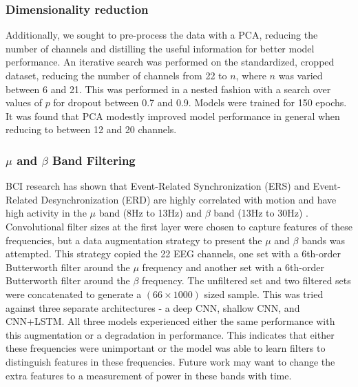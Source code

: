 \documentclass[10pt,twocolumn,letterpaper]{article}
\begin{document}
\subsubsection{Dimensionality reduction}
Additionally, we sought to pre-process the data with a PCA, reducing the number
of channels and distilling the useful information for better model performance.
An iterative search was performed on the standardized, cropped dataset,
reducing the number of channels from 22 to $n$, where $n$ was varied between 6
and 21. 
This was performed in a nested fashion with a search over values of $p$ for
dropout between 0.7 and 0.9. Models were trained for 150 epochs. It was found
that PCA modestly improved model performance in general when reducing to
between 12 and 20 channels.


\subsubsection{$\mu$ and $\beta$ Band Filtering}


BCI research has shown that Event-Related Synchronization (ERS) and
Event-Related Desynchronization (ERD) are highly correlated with motion and have
high activity in the $\mu$ band (8Hz to 13Hz) and $\beta$ band (13Hz to 30Hz)
\cite{yang2013subject}.
Convolutional filter sizes at the first layer were chosen to capture features of
these frequencies, but a data augmentation strategy to present the $\mu$ and
$\beta$ bands was attempted. This strategy copied the 22 EEG channels, one set
with a 6th-order Butterworth filter around the $\mu$ frequency and another set
with a 6th-order Butterworth filter around the $\beta$ frequency. The unfiltered
set and two filtered sets were concatenated to generate a $(66 \times 1000)$
sized sample. This was tried against three separate architectures - a deep CNN,
shallow CNN, and CNN+LSTM. All three models experienced either the same
performance with this augmentation or a degradation in performance. This
indicates that either these frequencies were unimportant or the model was
able to learn filters to distinguish features in these frequencies. Future work
may want to change the extra features to a measurement of power in these bands
with time.
\end{document}
